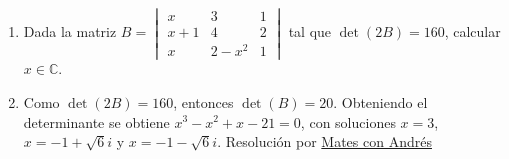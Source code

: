 \documentclass[a4paper]{article}
\newcommand{\answer}{\item[**]}
\begin{document}
\begin{enumerate}
\begin{enumerate} [label=(\alph*)]
		\item Dada la matriz $B=\begin{vmatrix} x & 3 & 1 \\ x+1 & 4 & 2 \\ x & 2-x^2 & 1\end{vmatrix}$ tal que $\det(2B)=160$, calcular $x\in\mathbb{C}$.
		\answer Como $\det(2B)=160$, entonces $\det(B)=20$. Obteniendo el determinante se obtiene $x^3-x^2+x-21=0$, con soluciones $x=3$, $x=-1+\sqrt{6}i$ y $x=-1-\sqrt{6}i$. Resolución por \href{https://youtu.be/ysZg6eVeoSY}{Mates con Andrés}

	\end{enumerate}

	
\end{enumerate}
\end{document}

